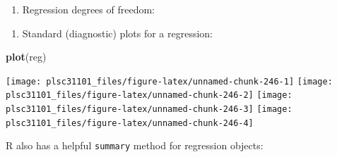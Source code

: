\documentclass[
]{book}
\newenvironment{Shaded}{\begin{snugshade}}{\end{snugshade}}
\newcommand{\CommentTok}[1]{\textcolor[rgb]{0.56,0.35,0.01}{\textit{#1}}}
\newcommand{\KeywordTok}[1]{\textcolor[rgb]{0.13,0.29,0.53}{\textbf{#1}}}
\newcommand{\NormalTok}[1]{#1}
\newcommand{\OperatorTok}[1]{\textcolor[rgb]{0.81,0.36,0.00}{\textbf{#1}}}
\providecommand{\tightlist}{%
  \setlength{\itemsep}{0pt}\setlength{\parskip}{0pt}}
\begin{document}
\begin{enumerate}
\def\labelenumi{\arabic{enumi}.}
\setcounter{enumi}{2}
\tightlist
\item
  Regression degrees of freedom:
\end{enumerate}

\begin{Shaded}
\end{Shaded}

\begin{enumerate}
\def\labelenumi{\arabic{enumi}.}
\setcounter{enumi}{3}
\tightlist
\item
  Standard (diagnostic) plots for a regression:
\end{enumerate}

\begin{Shaded}
\begin{Highlighting}[]
\KeywordTok{plot}\NormalTok{(reg)}
\end{Highlighting}
\end{Shaded}

\begin{center}\texttt{[image: plsc31101\_files/figure-latex/unnamed-chunk-246-1]} \texttt{[image: plsc31101\_files/figure-latex/unnamed-chunk-246-2]} \texttt{[image: plsc31101\_files/figure-latex/unnamed-chunk-246-3]} \texttt{[image: plsc31101\_files/figure-latex/unnamed-chunk-246-4]} \end{center}

R also has a helpful \texttt{summary} method for regression objects:
\end{document}
